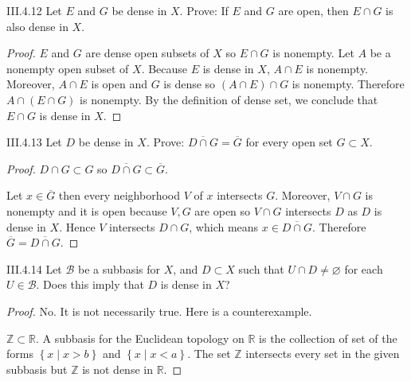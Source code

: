 \begin{problem}{III.4.12}
Let \(E\) and \(G\) be dense in \(X\). Prove: If \(E\) and \(G\) are open, then \(E \cap G\) is also dense in \(X\).
\end{problem}

\begin{proof}
    \( E \) and \( G \) are dense open subsets of \(X\) so \( E \cap G \) is nonempty. Let \( A \) be a nonempty open subset of \( X \). Because \( E \) is dense in \( X \), \( A \cap E \) is nonempty. Moreover, \( A \cap E \) is open and \( G \) is dense so \( (A \cap E) \cap G \) is nonempty. Therefore \( A \cap (E \cap G) \) is nonempty. By the definition of dense set, we conclude that \( E \cap G \) is dense in \( X \).
\end{proof}

\begin{problem}{III.4.13}\label{problem:III.4.13}
Let \(D\) be dense in \(X\). Prove: \( \overline{D \cap G} = \overline{G} \) for every open set \( G \subset X \).
\end{problem}

\begin{proof}
    \( D \cap G \subset G \) so \( \overline{D \cap G} \subset \overline{G} \).

    Let \( x \in \overline{G} \) then every neighborhood \(V\) of \(x\) intersects \( G \). Moreover, \( V \cap G \) is nonempty and it is open because \( V, G \) are open so \( V \cap G \) intersects \( D \) as \( D \) is dense in \( X \). Hence \( V \) intersects \( D \cap G \), which means \( x \in \overline{D \cap G} \). Therefore \( \overline{G} = \overline{D \cap G} \).
\end{proof}

\begin{problem}{III.4.14}
Let \( \mathscr{B} \) be a subbasis for \(X\), and \(D \subset X\) such that \( U \cap D \ne \varnothing \) for each \( U \in \mathscr{B} \). Does this imply that \(D\) is dense in \(X\)?
\end{problem}

\begin{proof}
    No. It is not necessarily true. Here is a counterexample.

    \( \mathbb{Z} \subset \mathbb{R} \). A subbasis for the Euclidean topology on \( \mathbb{R} \) is the collection of set of the forms \( \left\{ x \mid x > b \right\} \) and \( \left\{ x \mid x < a \right\} \). The set \( \mathbb{Z} \) intersects every set in the given subbasis but \( \mathbb{Z} \) is not dense in \( \mathbb{R} \).
\end{proof}

